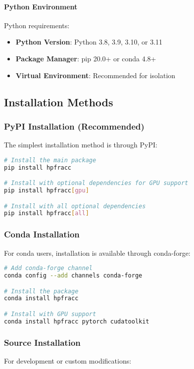 \paragraph{Python Environment}
Python requirements:
\begin{itemize}
    \item \textbf{Python Version}: Python 3.8, 3.9, 3.10, or 3.11
    \item \textbf{Package Manager}: pip 20.0+ or conda 4.8+
    \item \textbf{Virtual Environment}: Recommended for isolation
\end{itemize}

\subsection{Installation Methods}

\subsubsection{PyPI Installation (Recommended)}
The simplest installation method is through PyPI:

\begin{lstlisting}[language=bash, caption=PyPI Installation]
# Install the main package
pip install hpfracc

# Install with optional dependencies for GPU support
pip install hpfracc[gpu]

# Install with all optional dependencies
pip install hpfracc[all]
\end{lstlisting}

\subsubsection{Conda Installation}
For conda users, installation is available through conda-forge:

\begin{lstlisting}[language=bash, caption=Conda Installation]
# Add conda-forge channel
conda config --add channels conda-forge

# Install the package
conda install hpfracc

# Install with GPU support
conda install hpfracc pytorch cudatoolkit
\end{lstlisting}

\subsubsection{Source Installation}
For development or custom modifications:

